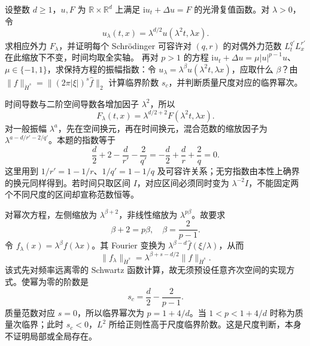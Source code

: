 \BookExercises

\begin{exercise}\label{b2:ex:app-E-1}
设整数 \(d\geq1\)，\(u,F\) 为 \(\mathbb R\times\mathbb R^d\) 上满足 \(\mathrm i u_t+\Delta u=F\) 的光滑复值函数。对 \(\lambda>0\)，令
\[
 u_\lambda(t,x)=\lambda^{d/2}u(\lambda^2t,\lambda x).
\]
求相应外力 \(F_\lambda\)，并证明每个 Schrödinger 可容许对 \((q,r)\) 的对偶外力范数 \(L^{q'}_tL^{r'}_x\) 在此缩放下不变，时间均取全实轴。
再对 \(p>1\) 的方程 \(\mathrm i u_t+\Delta u=\mu|u|^{p-1}u\)、\(\mu\in\{-1,1\}\)，求保持方程的振幅指数：令 \(u_\lambda=\lambda^\beta u(\lambda^2t,\lambda x)\)，应取什么 \(\beta\)？由
\(\|f\|_{\dot H^s}=\|(2\pi|\xi|)^s\widehat f\|_2\) 计算临界阶数 \(s_c\)，并判断质量尺度对应的临界幂次。
\end{exercise}
\begin{solution}
时间导数与二阶空间导数各增加因子 \(\lambda^2\)，所以
\[
 F_\lambda(t,x)=\lambda^{d/2+2}F(\lambda^2t,\lambda x).
\]
对一般振幅 \(\lambda^a\)，先在空间换元，再在时间换元，混合范数的缩放因子为 \(\lambda^{a-d/r'-2/q'}\)。本题的指数等于
\[
 \frac d2+2-\frac d{r'}-\frac2{q'}
 =-\frac d2+\frac dr+\frac2q=0.
\]
这里用到 \(1/r'=1-1/r\)、\(1/q'=1-1/q\) 及可容许关系；无穷指数由本性上确界的换元同样得到。若时间只取区间 \(I\)，对应区间必须同时变为 \(\lambda^{-2}I\)，不能固定两个不同尺度的区间却宣称范数恒等。

对幂次方程，左侧缩放为 \(\lambda^{\beta+2}\)，非线性缩放为 \(\lambda^{p\beta}\)。故要求
\[
 \beta+2=p\beta,\quad \beta=\frac2{p-1}.
\]
令 \(f_\lambda(x)=\lambda^\beta f(\lambda x)\)。其 Fourier 变换为 \(\lambda^{\beta-d}\widehat f(\xi/\lambda)\)，从而
\[
 \|f_\lambda\|_{\dot H^s}
 =\lambda^{\beta+s-d/2}\|f\|_{\dot H^s}.
\]
该式先对频率远离零的 Schwartz 函数计算，故无须预设任意齐次空间的实现方式。使幂为零的阶数是
\[
 s_c=\frac d2-\frac2{p-1}.
\]
质量范数对应 \(s=0\)，所以临界幂次为 \(p=1+4/d\)。当 \(1<p<1+4/d\) 时称为质量次临界；此时 \(s_c<0\)，\(L^2\) 所给正则性高于尺度临界阶数。这是尺度判断，本身不证明局部或全局存在。
\end{solution}

